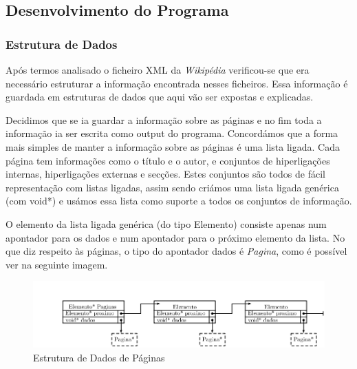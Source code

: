 \documentclass[11pt, a4paper, oneside]{article}
\begin{document}
\subsection{Desenvolvimento do Programa}

\subsubsection{Estrutura de Dados}

Após termos analisado o ficheiro XML da \textit{Wikipédia} verificou-se que era necessário estruturar a informação encontrada nesses ficheiros. Essa informação é guardada em estruturas de dados que aqui vão ser expostas e explicadas. 

Decidimos que se ia guardar a informação sobre as páginas e no fim toda a informação ia ser escrita como output do programa. Concordámos que a forma mais simples de manter a informação sobre as páginas é uma lista ligada. Cada página tem informações como o título e o autor, e conjuntos de hiperligações internas, hiperligações externas e secções. Estes conjuntos são todos de fácil representação com listas ligadas, assim sendo criámos uma lista ligada genérica (com void*) e usámos essa lista como suporte a todos os conjuntos de informação.

O elemento da lista ligada genérica (do tipo Elemento) consiste apenas num apontador para os dados e num apontador para o próximo elemento da lista.
No que diz respeito às páginas, o tipo do apontador dados é \emph{Pagina}, como é possível ver na seguinte imagem.

\begin{figure}[h]
\begin{center}
\includegraphics[width=0.9\linewidth]{paginas}
\caption{Estrutura de Dados de Páginas}
\end{center}
\end{figure}
\end{document}
